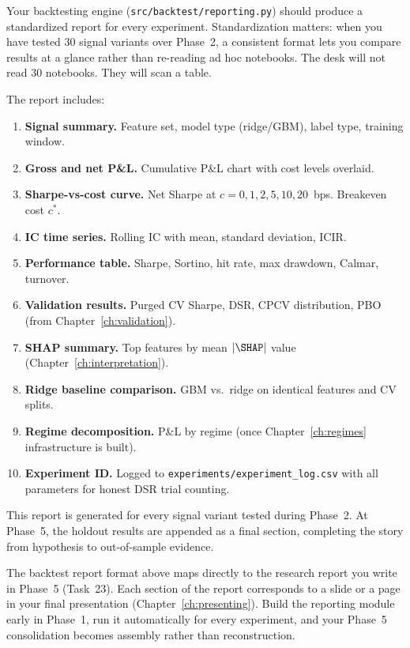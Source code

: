 Your backtesting engine (\texttt{src/backtest/reporting.py}) should produce a standardized report for every experiment.  Standardization matters: when you have tested 30 signal variants over Phase~2, a consistent format lets you compare results at a glance rather than re-reading ad hoc notebooks.  The desk will not read 30 notebooks.  They will scan a table.

The report includes:

\begin{enumerate}[nosep]
  \item \textbf{Signal summary.}  Feature set, model type (ridge/GBM), label type, training window.
  \item \textbf{Gross and net P\&L.}  Cumulative P\&L chart with cost levels overlaid.
  \item \textbf{Sharpe-vs-cost curve.}  Net Sharpe at $c = 0, 1, 2, 5, 10, 20$~bps.  Breakeven cost $c^*$.
  \item \textbf{IC time series.}  Rolling IC with mean, standard deviation, ICIR.
  \item \textbf{Performance table.}  Sharpe, Sortino, hit rate, max drawdown, Calmar, turnover.
  \item \textbf{Validation results.}  Purged CV Sharpe, DSR, CPCV distribution, PBO (from Chapter~\ref{ch:validation}).
  \item \textbf{SHAP summary.}  Top features by mean $|\SHAP|$ value (Chapter~\ref{ch:interpretation}).
  \item \textbf{Ridge baseline comparison.}  GBM vs.\ ridge on identical features and CV splits.
  \item \textbf{Regime decomposition.}  P\&L by regime (once Chapter~\ref{ch:regimes} infrastructure is built).
  \item \textbf{Experiment ID.}  Logged to \texttt{experiments/experiment\_log.csv} with all parameters for honest DSR trial counting.
\end{enumerate}

This report is generated for every signal variant tested during Phase~2.  At Phase~5, the holdout results are appended as a final section, completing the story from hypothesis to out-of-sample evidence.

\begin{projectconnection}
The backtest report format above maps directly to the research report you write in Phase~5 (Task~23).  Each section of the report corresponds to a slide or a page in your final presentation (Chapter~\ref{ch:presenting}).  Build the reporting module early in Phase~1, run it automatically for every experiment, and your Phase~5 consolidation becomes assembly rather than reconstruction.
\end{projectconnection}


